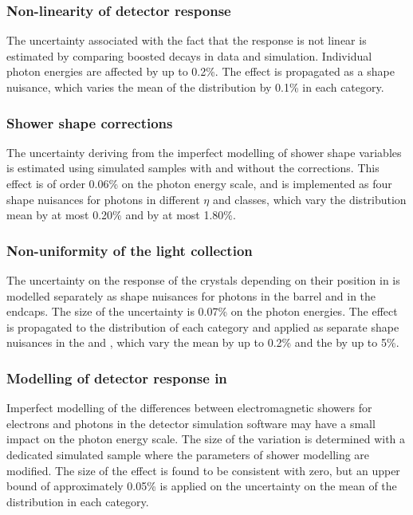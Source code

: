 \subsubsection{Non-linearity of detector response}
The uncertainty associated with the fact that the \ECAL response is not linear is estimated by comparing boosted \Zee decays in data and simulation. Individual photon energies are affected by up to 0.2\%. The effect is propagated as a shape nuisance, which varies the mean of the \mgg distribution by 0.1\% in each category.

\subsubsection{Shower shape corrections}
The uncertainty deriving from the imperfect modelling of shower shape variables is estimated using simulated samples with and without the corrections. This effect is of order 0.06\% on the photon energy scale, and is implemented as four shape nuisances for photons in different $\eta$ and \RNINE classes, which vary the \mgg distribution mean by at most 0.20\% and \effSigma by at most 1.80\%.

\subsubsection{Non-uniformity of the light collection}
The uncertainty on the response of the \ECAL crystals depending on their position in \eta is modelled separately as shape nuisances for photons in the barrel and in the endcaps. The size of the uncertainty is 0.07\% on the photon energies. The effect is propagated to the \mgg distribution of each category and applied as separate shape nuisances in the \EE and \EB, which vary the mean by up to 0.2\% and the \effSigma by up to 5\%.

\subsubsection{Modelling of detector response in \Geant}
Imperfect modelling of the differences between electromagnetic showers for electrons and photons in the detector simulation software \Geant may have a small impact on the photon energy scale. The size of the variation is determined with a dedicated simulated sample where the parameters of shower modelling are modified. The size of the effect is found to be consistent with zero, but an upper bound of approximately 0.05\% is applied on the uncertainty on the mean of the \mgg distribution in each category.


